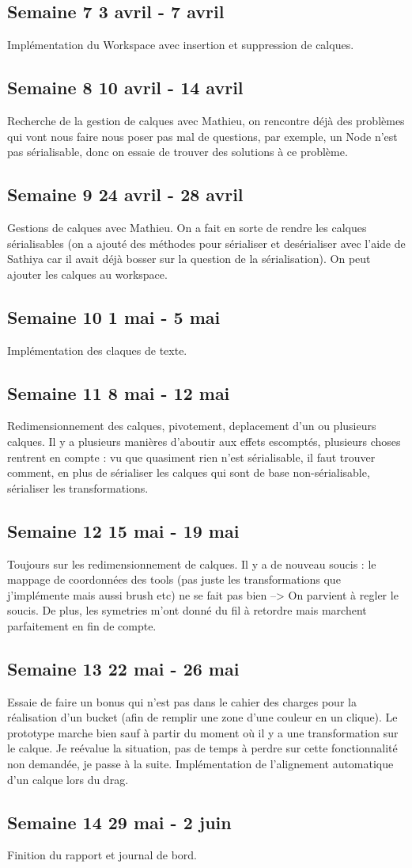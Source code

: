 \subsection{Semaine 7 3 avril - 7 avril}
Implémentation du Workspace avec insertion et suppression de calques.
\subsection{Semaine 8 10 avril - 14 avril}
Recherche de la gestion de calques avec Mathieu, on rencontre déjà des problèmes qui vont nous faire nous poser pas mal de questions, par exemple, un Node n'est pas sérialisable, donc on essaie de trouver des solutions à ce problème.
\subsection{Semaine 9 24 avril - 28 avril}
Gestions de calques avec Mathieu. On a fait en sorte de rendre les calques sérialisables (on a ajouté des méthodes pour sérialiser et desérialiser avec l'aide de Sathiya car il avait déjà bosser sur la question de la sérialisation). On peut ajouter les calques au workspace.
\subsection{Semaine 10 1 mai - 5 mai}
Implémentation des claques de texte.
\subsection{Semaine 11 8 mai - 12 mai} 
Redimensionnement des calques, pivotement, deplacement d'un ou plusieurs calques. Il y a plusieurs manières d'aboutir aux effets escomptés, plusieurs choses rentrent en compte : vu que quasiment rien n'est sérialisable, il faut trouver comment, en plus de sérialiser les calques qui sont de base non-sérialisable, sérialiser les transformations.
\subsection{Semaine 12 15 mai - 19 mai}
Toujours sur les redimensionnement de calques. Il y a de nouveau soucis : le mappage de coordonnées des tools (pas juste les transformations que j'implémente mais aussi brush etc) ne se fait pas bien --> On parvient à regler le soucis. De plus, les symetries m'ont donné du fil à retordre mais marchent parfaitement en fin de compte.
\subsection{Semaine 13 22 mai - 26 mai}
Essaie de faire un bonus qui n'est pas dans le cahier des charges pour la réalisation d'un bucket (afin de remplir une zone d'une couleur en un clique). Le prototype marche bien sauf à partir du moment où il y a une transformation sur le calque. Je reévalue la situation, pas de temps à perdre sur cette fonctionnalité non demandée, je passe à la suite. Implémentation de l'alignement automatique d'un calque lors du drag.
\subsection{Semaine 14 29 mai - 2 juin}
Finition du rapport et journal de bord.





